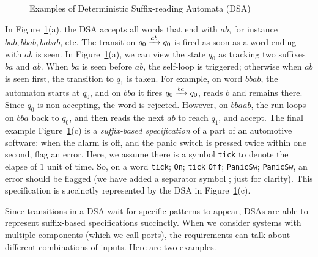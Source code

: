 \begin{figure}
  \caption{Examples of Deterministic Suffix-reading Automata (DSA)}
  \label{fig:dsa-examples}
  \end{figure}

  In Figure~\ref{fig:dsa-examples}(a), the DSA accepts all words that end with $ab$, for instance $bab, bbab, babab$, etc. The transition $q_0 \xrightarrow{ab} q_0$ is fired as soon as a word ending with $ab$ is seen. In Figure~\ref{fig:dsa-examples}(a), we can view the state $q_0$ as tracking two suffixes $ba$ and $ab$. When $ba$ is seen before $ab$, the self-loop is triggered; otherwise when $ab$ is seen first, the transition to $q_1$ is taken. For example, on word $bbab$, the automaton starts at $q_0$, and on $bba$ it fires $q_0 \xrightarrow{ba} q_0$, reads $b$ and remains there. Since $q_0$ is non-accepting, the word is rejected. However, on $bbaab$, the run loops on $bba$ back to $q_0$, and then reads the next $ab$ to reach $q_1$, and accept. The final example Figure~\ref{fig:dsa-examples}(c) is a \emph{suffix-based specification} of a part of an automotive software: when the alarm is off, and the panic switch is pressed twice within one second, flag an error. Here, we assume there is a symbol \texttt{tick} to denote the elapse of $1$ unit of time. So, on a word \texttt{tick}; \texttt{On}; \texttt{tick} \texttt{Off}; \texttt{PanicSw}; \texttt{PanicSw}, an error should be flagged (we have added a separator symbol ; just for clarity). This specification is succinctly represented by the DSA in Figure~\ref{fig:dsa-examples}(c).

   Since transitions in a DSA wait for specific patterns to appear, DSAs are able to represent suffix-based specifications succinctly. When we consider systems with multiple components (which we call ports), the requirements can talk about different combinations of inputs. Here are two examples. 

